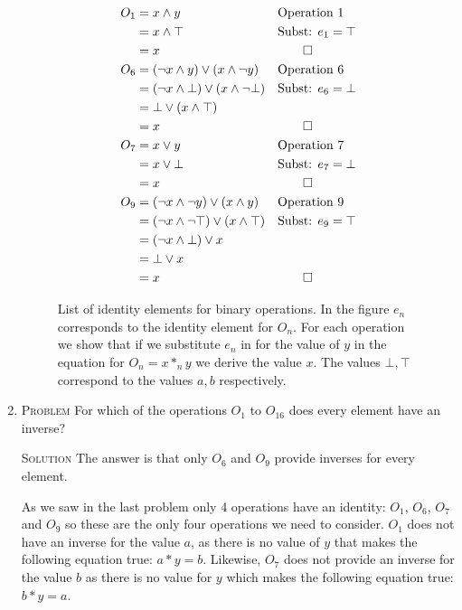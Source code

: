 \documentclass[twoside]{amsart}
\newcommand{\Solution}{\textsc{Solution}\xspace}
\newcommand{\Problem}{\textsc{Problem}\xspace}
\newcommand{\ltrue}{\top}
\newcommand{\lfalse}{\bot}
\begin{document}
\begin{enumerate}[label=\textbf{\arabic*}, leftmargin=1em]
   \begin{figure}
      \caption{List of identity elements for binary operations. In the figure
      $e_n$ corresponds to the identity element for $O_n$. For each operation
      we show that if we substitute $e_n$ in for the value of $y$ in the 
      equation for $O_n = x *_n y$ we derive the value $x$. The values
      $\lfalse, \ltrue$ correspond to the values $a, b$ respectively.}
      \label{fig:bool_ids}
      \begin{align*}
      O_1&=  x \land y  && \text{Operation 1}    \\
	 & = x \land \ltrue  && \text{Subst: } e_1 = \ltrue \\
	 & = x               && \qed                  \\
      O_6& = (\lnot x \land y) \lor (x \land \lnot y)
	                     && \text{Operation 6}    \\
	 & = (\lnot x \land \lfalse) \lor (x \land \lnot \lfalse)
	                     && \text{Subst: } e_6 = \lfalse \\
	 & = \lfalse \lor (x \land \ltrue)            \\
	 & = x               && \qed                  \\
      O_7& = x \lor y    && \text{Operation 7}    \\
	 & = x \lor \lfalse  && \text{Subst: } e_7 = \lfalse\\
	 & = x               && \qed                  \\
      O_9& = (\lnot x \land \lnot y) \lor (x \land y)
	                     && \text{Operation 9}    \\
	 & = (\lnot x \land \lnot \ltrue) \lor (x \land \ltrue)
	                     && \text{Subst: } e_9 = \ltrue \\
	 & = (\lnot x \land \lfalse) \lor x           \\
	 & = \lfalse \lor x                           \\
	 & = x               && \qed
      \end{align*}
   \end{figure}

   \item \Problem For which of the operations $O_1$ to $O_{16}$ does
   every element have an inverse?

   \noindent \Solution The answer is that only $O_6$ and $O_9$ provide
   inverses for every element.
   
   As we saw in the last problem only 4 operations
   have an identity: $O_1$, $O_6$, $O_7$ and $O_9$ so these are the only
   four operations we need to consider. $O_1$ does not have an inverse 
   for the value $a$, as there is no value of $y$ that makes the following
   equation true: $a * y = b$. Likewise, $O_7$ does not provide an inverse
   for the value $b$ as there is no value for $y$ which makes the 
   following equation true: $b * y = a$. 
   

\end{enumerate}
\end{document}
